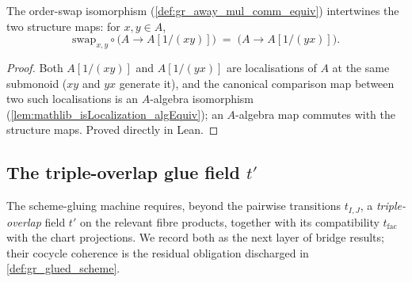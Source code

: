 \begin{lemma}

  \label{lem:gr_awayMulCommEquiv_comp_algebraMap}
  The order-swap isomorphism (\cref{def:gr_away_mul_comm_equiv}) intertwines the
  two structure maps: for \(x, y \in A\),
  \[
    \mathrm{swap}_{x,y} \circ \bigl(A \to A[1/(xy)]\bigr)
      \;=\; \bigl(A \to A[1/(yx)]\bigr).
  \]
\end{lemma}
\begin{proof}
  \leanok
  Both \(A[1/(xy)]\) and \(A[1/(yx)]\) are localisations of \(A\) at the same
  submonoid (\(xy\) and \(yx\) generate it), and the canonical comparison map
  between two such localisations is an \(A\)-algebra isomorphism
  (\cref{lem:mathlib_isLocalization_algEquiv}); an \(A\)-algebra map commutes with
  the structure maps. Proved directly in Lean.
\end{proof}


\subsection*{The triple-overlap glue field \(t'\)}

The scheme-gluing machine requires, beyond the pairwise transitions \(t_{I,J}\), a
\emph{triple-overlap} field \(t'\) on the relevant fibre products, together with
its compatibility \(t_{\mathrm{fac}}\) with the chart projections. We record both
as the next layer of bridge results; their cocycle coherence is the residual
obligation discharged in \cref{def:gr_glued_scheme}.

